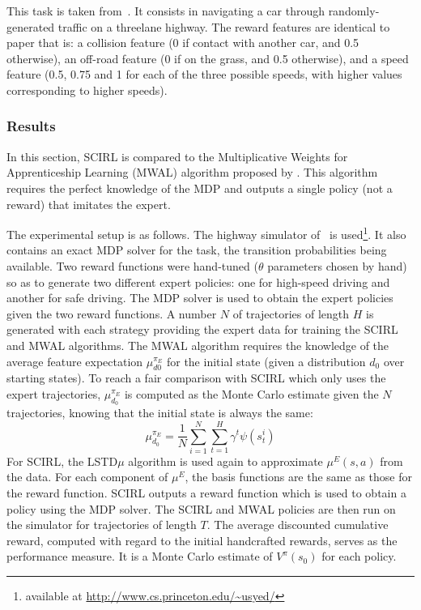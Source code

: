 \documentclass{article}
\begin{document}
This task is taken from~\cite{syed2008game}. It consists in
navigating a car through randomly-generated traffic on a threelane
highway. The reward features are identical to~\citet{syed2008game}
paper that is: a collision feature (0 if contact with another car,
and 0.5 otherwise), an off-road feature (0 if on the grass, and 0.5
otherwise), and a speed feature (0.5, 0.75 and 1 for each of the
three possible speeds, with higher values corresponding to higher
speeds).

\subsubsection{Results}

In this section, SCIRL is compared to the Multiplicative Weights for
Apprenticeship Learning (MWAL) algorithm proposed by
\citet{syed2008game}. This algorithm requires the perfect knowledge
of the MDP and outputs a single policy (not a reward) that imitates
the expert.

The experimental setup is as follows. The highway simulator
of~\cite{syed2008game} is used\footnote{available at \url{
http://www.cs.princeton.edu/~usyed/}}. It also contains an exact MDP
solver for the task, the transition probabilities being available.
Two reward functions were hand-tuned ($\theta$ parameters chosen by
hand) so as to generate two different expert policies: one for
high-speed driving and another for safe driving. The MDP solver is
used to obtain the expert policies given the two reward functions. A
number $N$ of trajectories of length $H$ is generated with each
strategy providing the expert data for training the SCIRL and MWAL
algorithms. The MWAL algorithm requires the knowledge of the average
feature expectation $\mu_{d0}^{\pi_E}$ for the initial state (given
a distribution $d_0$ over starting states). To reach a fair
comparison with SCIRL which only uses the expert trajectories,
$\mu_{d_0}^{\pi_E}$ is computed as the Monte Carlo estimate given
the $N$ trajectories, knowing that the initial state is always the
same:
%
$$\mu_{d_0}^{\pi_E} = \frac{1}{N}\sum_{i=1}^N \sum_{t=1}^H \gamma^t \psi(s_t^i)$$
%
For SCIRL, the LSTD$\mu$ algorithm is used again to approximate
$\mu^E(s,a)$ from the data. For each component of $\mu^E$, the basis
functions are the same as those for the reward function. SCIRL
outputs a reward function which is used to obtain a policy using the
MDP solver. The SCIRL and MWAL policies are then run on the
simulator for trajectories of length $T$. The average discounted
cumulative reward, computed with regard to the initial handcrafted
rewards, serves as the performance measure. It is a Monte Carlo
estimate of $V^\pi(s_0)$ for each policy.
\end{document}
